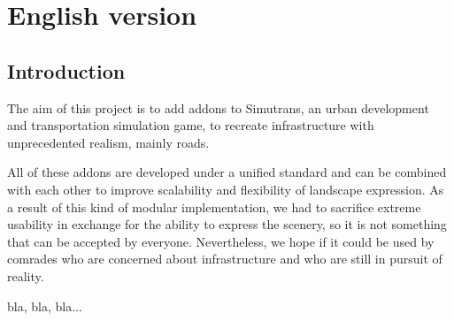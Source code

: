 \documentclass{jbook}
\begin{document}
\chapter{English version}

\section{Introduction}

The aim of this project is to add addons to Simutrans, an urban development and transportation simulation game, to recreate infrastructure with unprecedented realism, mainly roads.

All of these addons are developed under a unified standard and can be combined with each other to improve scalability and flexibility of landscape expression.
As a result of this kind of modular implementation, we had to sacrifice extreme usability in exchange for the ability to express the scenery, so it is not something that can be accepted by everyone.
Nevertheless, we hope if it could be used by comrades who are concerned about infrastructure and who are still in pursuit of reality.

bla, bla, bla...
\end{document}
